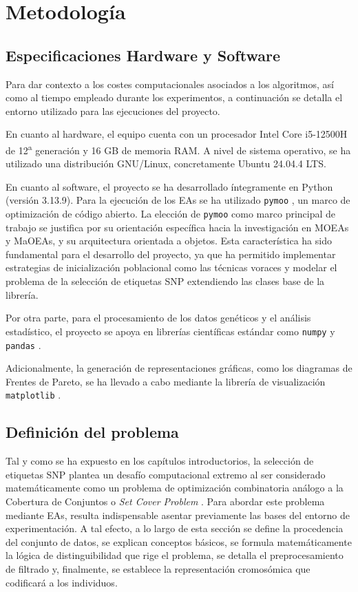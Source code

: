\chapter{Metodología}

\section{Especificaciones Hardware y Software}

Para dar contexto a los costes computacionales asociados a los algoritmos, así como al tiempo empleado durante los experimentos, a continuación se detalla el entorno utilizado para las ejecuciones del proyecto.

En cuanto al hardware, el equipo cuenta con un procesador Intel Core i5-12500H de 12\textsuperscript{a} generación y 16 GB de memoria RAM. A nivel de sistema operativo, se ha utilizado una distribución GNU/Linux, concretamente Ubuntu 24.04.4 LTS.

En cuanto al software, el proyecto se ha desarrollado íntegramente en Python \cite{python} (versión 3.13.9). Para la ejecución de los EAs se ha utilizado \texttt{pymoo} \cite{pymoo}, un marco de optimización de código abierto. La elección de \texttt{pymoo} como marco principal de trabajo se justifica por su orientación específica hacia la investigación en MOEAs y MaOEAs, y su arquitectura orientada a objetos. Esta característica ha sido fundamental para el desarrollo del proyecto, ya que ha permitido implementar estrategias de inicialización poblacional como las técnicas voraces y modelar el problema de la selección de etiquetas SNP extendiendo las clases base de la librería.

Por otra parte, para el procesamiento de los datos genéticos y el análisis estadístico, el proyecto se apoya en librerías científicas estándar como \texttt{numpy} \cite{numpy} y \texttt{pandas} \cite{pandas}.

Adicionalmente, la generación de representaciones gráficas, como los diagramas de Frentes de Pareto, se ha llevado a cabo mediante la librería de visualización \texttt{matplotlib} \cite{matplotlib}.

\section{Definición del problema}

Tal y como se ha expuesto en los capítulos introductorios, la selección de etiquetas SNP plantea un desafío computacional extremo al ser considerado matemáticamente como un problema de optimización combinatoria análogo a la Cobertura de Conjuntos o \textit{Set Cover Problem} \cite{bafna2003haplotypes}. Para abordar este problema mediante EAs, resulta indispensable asentar previamente las bases del entorno de experimentación. A tal efecto, a lo largo de esta sección se define la procedencia del conjunto de datos, se explican conceptos básicos, se formula matemáticamente la lógica de distinguibilidad que rige el problema, se detalla el preprocesamiento de filtrado y, finalmente, se establece la representación cromosómica que codificará a los individuos.

